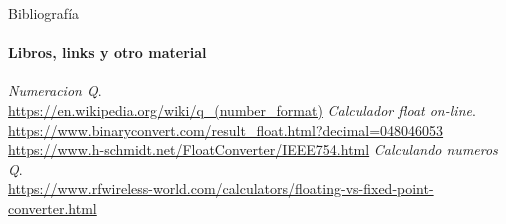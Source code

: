  \begin{frame}{Bibliografía}
    \framesubtitle{Libros, links y otro material}
    \tiny{
       \begin{thebibliography}{1}
             \emph{Numeracion Q}. \\
             \href {https://en.wikipedia.org/wiki/q_(number_format)}{https://en.wikipedia.org/wiki/q\_(number\_format)}
             \emph{Calculador float on-line}. \\
             \href {https://www.binaryconvert.com/result\_float.html?decimal=048046053}{https://www.binaryconvert.com/result\_float.html?decimal=048046053}
             \href {https://www.h-schmidt.net/FloatConverter/IEEE754.html}{https://www.h-schmidt.net/FloatConverter/IEEE754.html}
             \emph{Calculando numeros Q}. \\
             \href {https://www.rfwireless-world.com/calculators/floating-vs-fixed-point-converter.html}{https://www.rfwireless-world.com/calculators/floating-vs-fixed-point-converter.html}
       \end{thebibliography}
    }
 \end{frame}
\appendix
